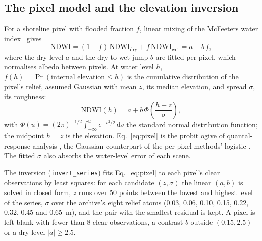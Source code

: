 
\subsection{The pixel model and the elevation inversion}\label{sec:pixel}

For a shoreline pixel with flooded fraction $f$, linear mixing of the
McFeeters water index~\cite{mcfeeters1996} gives
\begin{equation}\label{eq:mix}
\mathrm{NDWI} = (1-f)\,\mathrm{NDWI}_{\mathrm{dry}} + f\,\mathrm{NDWI}_{\mathrm{wet}}
= a + b\,f ,
\end{equation}
where the dry level $a$ and the dry-to-wet jump $b$ are fitted per
pixel, which normalises albedo between pixels. At water level $h$,
$f(h) = \Pr(\text{internal elevation} \le h)$ is the cumulative
distribution of the pixel's relief, assumed Gaussian with mean $z$, its
median elevation, and spread $\sigma$, its roughness:
\begin{equation}\label{eq:pixel}
\mathrm{NDWI}(h) = a + b\,\Phi\!\left(\frac{h - z}{\sigma}\right),
\end{equation}
with $\Phi(u) = (2\pi)^{-1/2}\int_{-\infty}^{u} e^{-v^{2}/2}\,\mathrm{d}v$
the standard normal distribution function; the midpoint $h = z$ is the
elevation. Eq.~\eqref{eq:pixel} is the probit ogive of
quantal-response analysis \cite{bliss1934,finney1947}, the Gaussian
counterpart of the per-pixel methods' logistic \cite{berkson1944}. The
fitted $\sigma$ also absorbs the water-level error of each scene.

The inversion (\texttt{invert\_series}) fits Eq.~\eqref{eq:pixel} to
each pixel's clear observations by least squares: for each candidate
$(z, \sigma)$ the linear $(a, b)$ is solved in closed form, $z$ runs
over 50 points between the lowest and highest level of the series,
$\sigma$ over the archive's eight relief atoms (0.03, 0.06, 0.10, 0.15,
0.22, 0.32, 0.45 and 0.65~m), and the pair with the smallest residual is
kept. A pixel is left blank with fewer than 8 clear observations, a
contrast $b$ outside $(0.15, 2.5)$ or a dry level $|a| \ge 2.5$.

